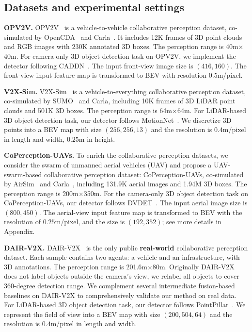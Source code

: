 \vspace{-2mm}
\subsection{Datasets and experimental settings}
\label{sec:ExpDetails}
\vspace{-2mm}
\textbf{OPV2V.}
OPV2V~\cite{OPV2V} is a vehicle-to-vehicle collaborative perception dataset, co-simulated by OpenCDA~\cite{OPV2V} and Carla~\cite{carla}. It includes $12$K frames of 3D point clouds and RGB images with $230$K annotated 3D boxes. The perception range is 40m$\times$40m. For camera-only 3D object detection task on OPV2V, we implement the detector following CADDN~\cite{CaDDN}. The input front-view image size is $(416, 160)$. The front-view input feature map is transformed to BEV with resolution $0.5$m/pixel.

\textbf{V2X-Sim.}
V2X-Sim~\cite{V2XSim} is a vehicle-to-everything collaborative perception dataset, co-simulated by SUMO~\cite{sumo} and Carla, including 10K frames of 3D LiDAR  point clouds and 501K 3D boxes. The perception range is 64m$\times$64m. For LiDAR-based 3D object detection task, our detector follows MotionNet~\cite{Wu2020MotionNetJP}. We discretize 3D points into a BEV map with size  $(256, 256, 13)$ and the resolution is $0.4$m/pixel in length and width, $0.25$m in height.

\textbf{CoPerception-UAVs.}
To enrich the collaborative perception datasets, we consider the swarm of unmanned aerial vehicles (UAV) and propose a UAV-swarm-based collaborative perception dataset: CoPerception-UAVs, co-simulated by AirSim~\cite{Airsim} and Carla~\cite{carla}, including 131.9K aerial images and 1.94M 3D boxes. The perception range is 200m$\times$350m. For the camera-only 3D object detection task on CoPerception-UAVs, our detector follows DVDET~\cite{DVDET}. The input aerial image size is $(800, 450)$. The aerial-view input feature map is transformed to BEV with the resolution of $0.25$m/pixel, and the size is $(192,352)$; see more details in Appendix.

\textbf{DAIR-V2X.} DAIR-V2X~\cite{dair} is the only public \textbf{real-world} collaborative perception dataset. Each sample contains two agents: a vehicle and an infrastructure, with 3D annotations. The perception range is 201.6m$\times$80m.  Originally DAIR-V2X does not label objects outside the camera's view, we relabel all objects to cover 360-degree detection range. We complement several intermediate fusion-based baselines on DAIR-V2X to comprehensively validate our method on real data. For LiDAR-based 3D object detection task, our detector follows PointPillar~\cite{PointPillar}. We represent the field of view into a BEV map with size $(200, 504, 64)$ and the resolution is $0.4$m/pixel in length and width.



